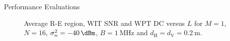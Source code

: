 \documentclass[journal]{IEEEtran}
\begin{document}
\begin{section}{Performance Evaluations}
		\begin{figure}[!t]
			\centering
			\caption{Average R-E region, WIT SNR and WPT DC versus $L$ for $M=1$, $N=16$, $\sigma_n^2=\SI{-40}{\dBm}$, $B=\SI{1}{\MHz}$ and $d_{\mathrm{H}}=d_{\mathrm{V}}=\SI{0.2}{\meter}$.}
		\end{figure}


\end{section}
\end{document}
